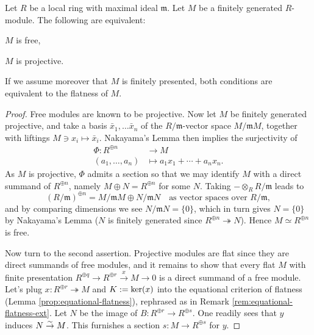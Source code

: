 \begin{theorem}\label{prop:free-proj}
	Let $R$ be a local ring with maximal ideal $\mathfrak{m}$. Let $M$ be a finitely generated $R$-module. The following are equivalent:
	\begin{compactitem}
		\item $M$ is free,
		\item $M$ is projective.
	\end{compactitem}
	If we assume moreover that $M$ is finitely presented, both conditions are equivalent to the flatness of $M$.
\end{theorem}
\begin{proof}
	Free modules are known to be projective. Now let $M$ be finitely generated projective, and take a basis $\bar{x}_1, \ldots \bar{x}_n$ of the $R/\mathfrak{m}$-vector space $M/\mathfrak{m}M$, together with liftings $M \ni x_i \mapsto \bar{x}_i$. Nakayama's Lemma then implies the surjectivity of
	\begin{align*}
		\Phi: R^{\oplus n} & \longrightarrow M \\
		(a_1, \ldots, a_n) & \longmapsto a_1 x_1 + \cdots + a_n x_n.
	\end{align*}
	As $M$ is projective, $\Phi$ admits a section so that we may identify $M$ with a direct summand of $R^{\oplus n}$, namely $M \oplus N = R^{\oplus n}$ for some $N$. Taking $- \otimes_R R/\mathfrak{m}$ leads to
	\[ (R/\mathfrak{m})^{\oplus n} = M/\mathfrak{m}M \oplus N/\mathfrak{m}N \quad \text{as vector spaces over } R/\mathfrak{m}, \]
	and by comparing dimensions we see $N/\mathfrak{m}N = \{0\}$, which in turn gives $N = \{0\}$ by Nakayama's Lemma ($N$ is finitely generated since $R^{\oplus n} \twoheadrightarrow N$). Hence $M \simeq R^{\oplus n}$ is free.
	
	Now turn to the second assertion. Projective modules are flat since they are direct summands of free modules, and it remains to show that every flat $M$ with finite presentation $R^{\oplus q} \to R^{\oplus r} \xrightarrow{x} M \to 0$ is a direct summand of a free module. Let's plug $x: R^{\oplus r} \twoheadrightarrow M$ and $K := \operatorname{ker}(x)$ into the equational criterion of flatness (Lemma \ref{prop:equational-flatness}), rephrased as in Remark \ref{rem:equational-flatness-ext}. Let $N$ be the image of $B: R^{\oplus r} \to R^{\oplus s}$. One readily sees that $y$ induces $N \stackrel{\sim}{\rightarrow} M$. This furnishes a section $s: M \to R^{\oplus s}$ for $y$.
\end{proof}

